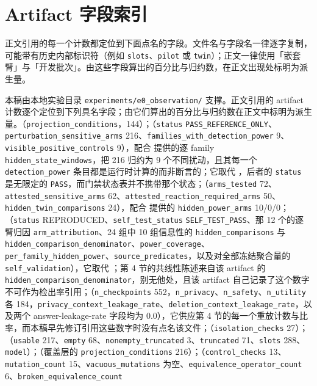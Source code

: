 \documentclass[UTF8,11pt]{ctexart}
\begin{document}
\section{Artifact 字段索引}
\label{app:availability-index-zh}
正文引用的每一个计数都定位到下面点名的字段。文件名与字段名一律逐字复制，可能带有历史内部标识符（例如 \texttt{slots}、\texttt{pilot} 或 \texttt{twin}）；正文一律使用「嵌套臂」与「开发批次」。由这些字段算出的百分比与归约数，在正文出现处标明为派生量。
\begin{sloppypar}
本稿由本地实验目录 \texttt{experiments/e0\_observation/} 支撑。正文引用的 artifact 计数逐个定位到下列具名字段；由它们算出的百分比与归约数在正文中标明为派生量。（\texttt{projection\_conditions}，144）；（\texttt{status} \texttt{PASS\_REFERENCE\_ONLY}、\texttt{perturbation\_sensitive\_arms} 216、\texttt{families\_with\_detection\_power} 9、\texttt{visible\_positive\_controls} 9），配合  提供的逐 family \texttt{hidden\_state\_windows}，把 216 归约为 9 个不同扰动，且其每一个 \texttt{detection\_power} 条目都是运行时计算的而非断言的；它取代 ，后者的 \texttt{status} 是无限定的 \texttt{PASS}，而门禁状态表并不携带那个状态；（\texttt{arms\_tested} 72、\texttt{attested\_sensitive\_arms} 62、\texttt{attested\_reaction\_required\_arms} 50、\texttt{hidden\_twin\_comparisons} 24），配合  提供的 \texttt{hidden\_power\_arms} 10/0/0；（\texttt{status} REPRODUCED、\texttt{self\_test\_status} \texttt{SELF\_TEST\_PASS}、那 12 个的逐臂归因 \texttt{arm\_attribution}、24 组中 10 组信息性的 \texttt{hidden\_comparisons} 与 \texttt{hidden\_comparison\_denominator}、\texttt{power\_coverage}、\texttt{per\_family\_hidden\_power}、\texttt{source\_predicates}，以及对全部冻结聚合量的 \texttt{self\_validation}），它取代 ；第 4 节的共线性陈述来自该 artifact 的 \texttt{hidden\_comparison\_denominator}，别无他处，且该 artifact 自己记录了这个数字不可作为检出率引用；（\texttt{n\_checkpoints} 552，\texttt{n\_privacy}、\texttt{n\_safety}、\texttt{n\_utility} 各 184，\texttt{privacy\_context\_leakage\_rate}、\texttt{deletion\_context\_leakage\_rate}，以及两个 answer-leakage-rate 字段均为 0.0），它供应第 4 节的每一个重放计数与比率，而本稿早先修订引用这些数字时没有点名该文件；（\texttt{isolation\_checks} 27）；（\texttt{usable} 217、\texttt{empty} 68、\texttt{nonempty\_truncated} 3、\texttt{truncated} 71、\texttt{slots} 288、\texttt{model}）；（覆盖层的 \texttt{projection\_conditions} 216）；（\texttt{control\_checks} 13、\texttt{mutation\_count} 15、\texttt{vacuous\_mutations} 为空、\texttt{equivalence\_operator\_count} 6、\texttt{broken\_equivalence\_count} 
\end{sloppypar}
\end{document}
